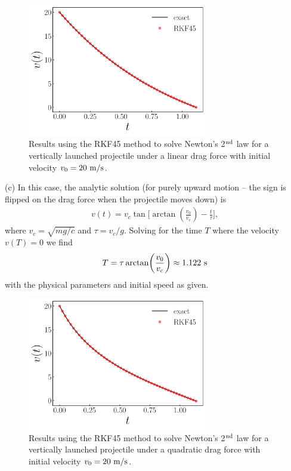 {\begin{figure}[H]
    \centering
    \includegraphics[width=0.7\textwidth]{prob4b.pdf}
    \caption{Results using the RKF45 method to solve Newton's 2$^{\rm nd}$ law for a vertically launched projectile under a linear drag force with initial velocity $v_0 = 20~{\rm m/s}$.}
    \label{fig:prob4b}
\end{figure}



(c) In this case, the analytic solution (for purely upward motion -- the sign is flipped on the drag force when the projectile moves down) is
\begin{align}
    v(t) = v_{c} \tan\Bigg[ \arctan(\frac{v_0}{v_{c}})  - \frac{t}{\tau} \Bigg]
,\end{align}
where $v_{c} = \sqrt{m g / c}$ and $\tau = v_{c} / g$.
Solving for the time $T$ where the velocity $v(T) = 0$ we find
\begin{align}
    T = \tau \arctan(\frac{v_0}{v_{c}}) \approx 1.122~{\rm s}
\end{align}
with the physical parameters and initial speed as given.

\begin{figure}[H]
    \centering
    \includegraphics[width=0.7\textwidth]{prob4c.pdf}
    \caption{Results using the RKF45 method to solve Newton's 2$^{\rm nd}$ law for a vertically launched projectile under a quadratic drag force with initial velocity $v_0 = 20~{\rm m/s}$.}
    \label{fig:prob4c}
\end{figure}


}

    


